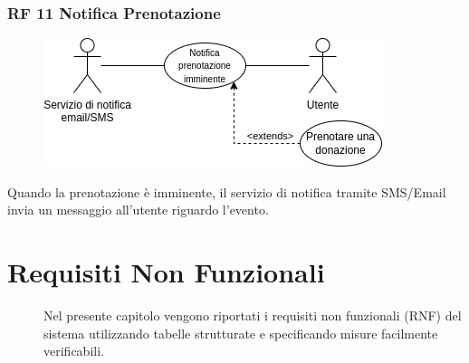 \documentclass{article}
\begin{document}
\subsubsection{RF 11 Notifica Prenotazione}\label{rf_11}
\begin{description}
	
	\begin{figure}[htp]
		\centering
		\includegraphics[]{rf11.png}
	\end{figure}
		
	\item Quando la prenotazione è imminente, il servizio di notifica tramite SMS/Email invia un messaggio all'utente riguardo l'evento.
\end{description}
\clearpage


\section{Requisiti Non Funzionali}
\begin{description}
	\item[] Nel presente capitolo vengono riportati i requisiti non funzionali (RNF) del sistema utilizzando tabelle strutturate e specificando misure facilmente verificabili. 
\end{description}
\end{document}
